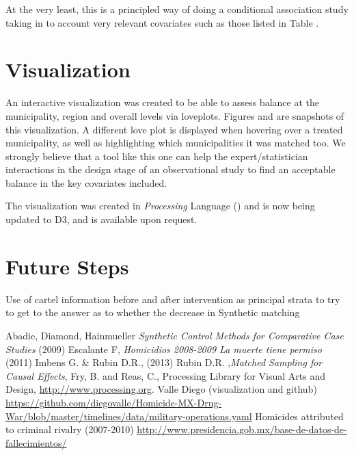 \documentclass{article}[11 pt]
\begin{document}
At the very least, this is a principled way of doing a conditional association study taking in to account very relevant covariates such as those listed in Table \label{Tab1}.

\section{Visualization}
An interactive visualization was created to be able to assess balance at the municipality, region and overall levels via loveplots. Figures \label{treatedUnits} and \label{FigMatches} are snapshots of this visualization. A different love plot is displayed when hovering over a treated municipality, as well as highlighting which municipalities it was matched too. We strongly believe that a tool like this one can help the expert/statistician interactions in the design stage of an observational study to find an acceptable balance in the key covariates included. 

The visualization was created in \emph{Processing} Language (\cite{Processing}) and is now being updated to D3, and is available upon request.

\section{Future Steps}
Use of cartel information before and after intervention as principal strata to try to get to the answer as to whether the decrease in 
Synthetic matching


        \begin{thebibliography}{99}
           Abadie, Diamond, Hainmueller  \emph{Synthetic Control Methods for Comparative Case Studies} (2009)
           Escalante F, \emph{Homicidios 2008-2009 La muerte tiene permiso} (2011)
           Imbens G. \& Rubin D.R., (2013)
           Rubin D.R. ,\emph{Matched Sampling for Causal Effects},
 Fry, B. and Reas, C., Processing Library for Visual Arts and Design, \url{http://www.processing.org}.   
            Valle Diego (visualization and github) \url{https://github.com/diegovalle/Homicide-MX-Drug-War/blob/master/timelines/data/military-operations.yaml}
		Homicides attributed to criminal rivalry (2007-2010)
	\url{http://www.presidencia.gob.mx/base-de-datos-de-fallecimientos/}
       
\end{thebibliography}

\end{document}
